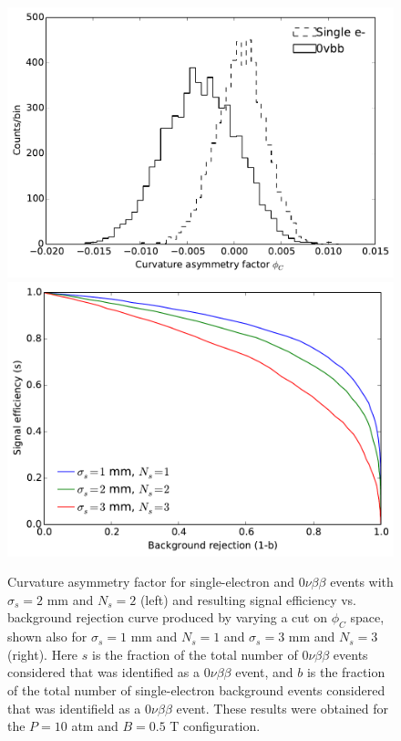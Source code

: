 \documentclass{JINST}
\begin{document}
\begin{figure}[!htb]
	\includegraphics[scale=0.44]{fig/10atm_05T_scurv_diff_means.pdf}
	\includegraphics[scale=0.44]{fig/10atm_05T_sigvsb_all.pdf}
	\caption{\label{fig_svsbg}Curvature asymmetry factor for single-electron and $0\nu\beta\beta$ events with $\sigma_{s} = 2$ mm and $N_{s} = 2$ (left) and resulting signal efficiency vs. background rejection curve produced by varying a cut on $\phi_{C}$ space, shown also for $\sigma_{s} = 1$ mm and $N_{s} = 1$ and $\sigma_{s} = 3$ mm and $N_{s} = 3$ (right).  Here $s$ is the fraction of the total number of $0\nu\beta\beta$ events considered that was identified as a $0\nu\beta\beta$ event, and $b$ is the fraction of the total number of single-electron background events considered that was identifield as a $0\nu\beta\beta$ event.  These results were obtained for the $P = 10$ atm and $B = 0.5$ T configuration.}
\end{figure}
\end{document}
